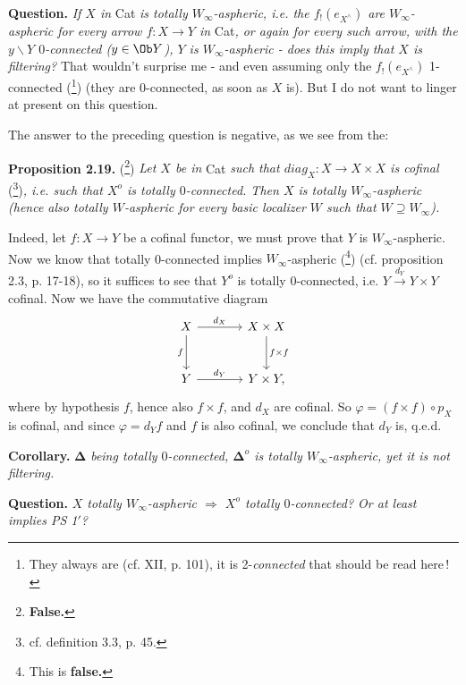 \noindent\textbf{Question.} \textit{If $X$ in} Cat \textit{is totally $W_\infty$-aspheric, i.e. the $f_!(e_{X^\wedge})$ are $W_\infty$-aspheric for every arrow $f : X \longrightarrow Y$ in} Cat\textit{, or again for every such arrow, with the $y\backslash Y$ $0$-connected ($y \in \Ob Y$), $Y$ is $W_\infty$-aspheric - does this imply that $X$ is filtering?} That wouldn't surprise me - and even assuming only the $f_!(e_{X^\wedge})$ 1-connected (\footnote[42]{They always are (cf. XII, p. 101), it is 2-\textit{connected} that should be read here\,!}) (they are 0-connected, as soon as $X$ is). But I do not want to linger at present on this question.

The answer to the preceding question is negative, as we see from the:


\noindent\textbf{Proposition 2.19.} (\footnote[43]{\textbf{False.}}) \textit{Let $X$ be in} Cat \textit{such that $\mathit{diag}_X : X \longrightarrow X \times X$ is cofinal} (\footnote[44]{cf. definition 3.3, p. 45.})\textit{, i.e. such that $X^o$ is totally $0$-connected. Then $X$ is totally $W_\infty$-aspheric (hence also totally $W$-aspheric for every basic localizer $W$ such that $W \supseteq W_\infty$).}

Indeed, let $f : X \longrightarrow Y$ be a cofinal functor, we must prove that $Y$ is $W_\infty$-aspheric. Now we know that totally 0-connected implies $W_\infty$-aspheric (\footnote[45]{This is \textbf{false.}}) (cf. proposition 2.3, p. 17-18), so it suffices to see that $Y^o$ is totally 0-connected, i.e. $Y \xrightarrow{d_Y} Y \times Y$ cofinal. Now we have the commutative diagram
\[
\begin{tikzcd}[row sep=large, column sep=large]
X \arrow[r, "d_X"] \arrow[d, "f"'] & X \times X \arrow[d, "f \times f"] \\
Y \arrow[r, "d_Y"] & Y \times Y,
\end{tikzcd}
\]
where by hypothesis $f$, hence also $f \times f$, and $d_X$ are cofinal. So $\varphi = (f \times f) \circ p_X$ is cofinal, and since $\varphi = d_Y f$ and $f$ is also cofinal, we conclude that $d_Y$ is, q.e.d.

\noindent\textbf{Corollary.} $\boldsymbol{\Delta}$ \textit{being totally $0$-connected, $\boldsymbol{\Delta}^o$ is totally $W_\infty$-aspheric, yet it is not filtering.}

\noindent\textbf{Question.} \textit{$X$ totally $W_\infty$-aspheric $\Longrightarrow$ $X^o$ totally $0$-connected? Or at least implies PS 1$'$?}

